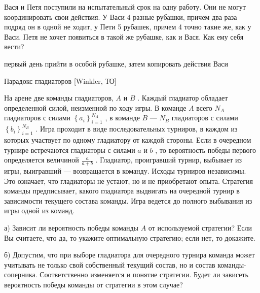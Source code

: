 \begin{problem}

Вася и Петя поступили на испытательный срок на одну работу. Они не могут координировать свои действия. У Васи 4 разные рубашки, причем два раза подряд он в одной не ходит, у Пети 5 рубашек, причем 4 точно такие же, как у Васи. Петя не хочет появиться в такой же рубашке, как и Вася. Как ему себя вести? \par



\begin{sol}
первый день прийти в особой рубашке, затем копировать действия Васи
\end{sol}
\end{problem}



\begin{problem}
 Парадокс гладиаторов [Winkler, ТО]\par
На арене две команды гладиаторов,  $A$  и  $B$ . Каждый гладиатор обладает определенной силой, неизменной по ходу игры. В команде  $A$  всего  $N_{A} $  гладиаторов с силами  $\left\{a_{i} \right\}_{i=1}^{N_{A} } $ , в команде  $B$  —  $N_{B} $  гладиаторов с силами  $\left\{b_{i} \right\}_{i=1}^{N_{B} } $ . Игра проходит в виде последовательных турниров, в каждом из которых участвует по одному гладиатору от каждой стороны. Если в очередном турнире встречаются гладиаторы с силами  $a$  и  $b$ , то вероятность победы первого определяется величиной  $\frac{a}{a+b} $ . Гладиатор, проигравший турнир, выбывает из игры, выигравший — возвращается в команду. Исходы турниров независимы. Это означает, что гладиаторы не устают, но и не приобретают опыта. Стратегия команды предписывает, какого гладиатора выдвигать на очередной турнир в зависимости текущего состава команды. Игра ведется до полного выбывания из игры одной из команд.\par
а) Зависит ли вероятность победы команды  $A$  от используемой стратегии? Если Вы считаете, что да, то укажите оптимальную стратегию; если нет, то докажите.\par
б) Допустим, что при выборе гладиатора для очередного турнира команда может учитывать не только свой собственный текущий состав, но и состав команды-соперника. Соответственно изменяется и понятие стратегии. Будет ли зависеть вероятность победы команды от стратегии в этом случае?\par



\begin{sol}

\end{sol}
\end{problem}




